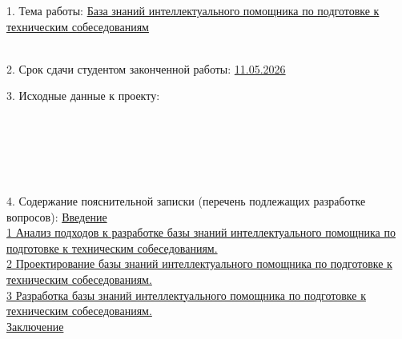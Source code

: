 {\begin{center}
  \end{center}

  1. Тема работы: \uline{База знаний интеллектуального помощника по подготовке к техническим собеседованиям}\lineunderscore\\
  \lineunderscore\\
  \vspace{1em}

  2. Срок сдачи студентом законченной работы: \uline{11.05.2026}\lineunderscore

  \vspace{1em}

  3. Исходные данные к проекту: 
  \lineunderscore\\
  \lineunderscore\\
  \lineunderscore\\
  \lineunderscore\\
  \lineunderscore\\
  \lineunderscore\\
  \lineunderscore

  \vspace{1em}

  4. Содержание пояснительной записки (перечень подлежащих разработке вопросов):
  \newline
  \uline{\hspace*{2ex}Введение}\lineunderscore\\
  \uline{\hspace*{2ex}1 Анализ подходов к разработке базы знаний интеллектуального помощника по подготовке к техническим собеседованиям.}\lineunderscore\\
  \uline{\hspace*{2ex}2 Проектирование базы знаний интеллектуального помощника по подготовке к}\lineunderscore\\
  \uline{\hspace*{2ex}техническим собеседованиям.}\lineunderscore\\
  \uline{\hspace*{2ex}3 Разработка базы знаний интеллектуального помощника по подготовке к}\lineunderscore\\
  \uline{\hspace*{2ex}техническим собеседованиям.}\lineunderscore\\
  \uline{\hspace*{2ex}Заключение}\lineunderscore\\
  \lineunderscore\\
  \lineunderscore\\
  \lineunderscore\\
  \lineunderscore\\

}
